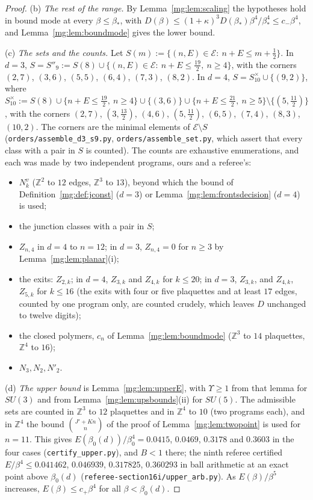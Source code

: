 \documentclass[11pt,a4paper]{article}
\theoremstyle{definition}
\theoremstyle{remark}
\newcommand{\Z}{\mathbb{Z}}
\begin{document}
\begin{proof}
(b) \emph{The rest of the range.} By Lemma~\ref{mg:lem:scaling} the hypotheses hold in bound mode at every $\beta\le\beta_*$, with $D(\beta)\le(1+\kappa)^3D(\beta_*)\beta^4/\beta_*^4\le c_-\beta^4$, and
Lemma~\ref{mg:lem:boundmode} gives the lower bound.

(c) \emph{The sets and the counts.} Let $S(m):=\{(n,E)\in\mathcal E:\ n+E\le m+\frac12\}$. In $d=3$, $S=S''_9:=S(8)\cup\{(n,E)\in\mathcal E:\ n+E\le\frac{19}2,\ n\ge4\}$, with the corners
$(2,7)$, $(3,6)$, $(5,5)$, $(6,4)$, $(7,3)$, $(8,2)$. In $d=4$, $S=S^\times_{10}\cup\{(9,2)\}$, where $S^\times_{10}:=S(8)\cup\{n+E\le\frac{19}2,\ n\ge4\}\cup\{(3,6)\}\cup\{n+E\le\frac{21}2,\ n\ge5\}\setminus\{(5,\frac{11}2)\}$,
with the corners $(2,7)$, $(3,\frac{13}2)$, $(4,6)$, $(5,\frac{11}2)$, $(6,5)$, $(7,4)$, $(8,3)$, $(10,2)$. The corners are the minimal elements of $\mathcal E\setminus S$ (\texttt{orders/assemble\_d3\_s9.py},
\texttt{orders/assemble\_set.py}, which assert that every class with a pair in $S$ is counted). The counts are exhaustive enumerations, and each was made by two independent programs, ours and a referee's:
\begin{itemize}
\item $N^v_k$ ($\Z^2$ to $12$ edges, $\Z^3$ to $13$), beyond which the bound of Definition~\ref{mg:def:jconst} ($d=3$) or Lemma~\ref{mg:lem:frontsdecision} ($d=4$) is used;
\item the junction classes with a pair in $S$;
\item $Z_{n,4}$ in $d=4$ to $n=12$; in $d=3$, $Z_{n,4}=0$ for $n\ge3$ by Lemma~\ref{mg:lem:planar}(i);
\item the exits: $Z_{2,k}$; in $d=4$, $Z_{3,k}$ and $Z_{4,k}$ for $k\le20$; in $d=3$, $Z_{3,k}$, and $Z_{4,k}$, $Z_{5,k}$ for $k\le16$ (the exits with four or five plaquettes and at least $17$ edges,
counted by one program only, are counted crudely, which leaves $D$ unchanged to twelve digits);
\item the closed polymers, $c_n$ of Lemma~\ref{mg:lem:boundmode} ($\Z^3$ to $14$ plaquettes, $\Z^4$ to $16$);
\item $N_3,N_2,N'_2$.
\end{itemize}

(d) \emph{The upper bound} is Lemma~\ref{mg:lem:upperE}, with $\Upsilon\ge1$ from that lemma for $SU(3)$ and from Lemma~\ref{mg:lem:upsbounds}(ii) for $SU(5)$. The admissible sets are counted in $\Z^3$ to
$12$ plaquettes and in $\Z^4$ to $10$ (two programs each), and in $\Z^4$ the bound $\binom{J'+Kn}n$ of the proof of Lemma~\ref{mg:lem:twopoint} is used for $n=11$. This gives
$E(\beta_0(d))/\beta_0^4=0.0415$, $0.0469$, $0.3178$ and $0.3603$ in the four cases (\texttt{certify\_upper.py}), and $B<1$ there; the ninth referee certified
$E/\beta^4\le0.041462$, $0.046939$, $0.317825$, $0.360293$ in ball arithmetic at an exact point above $\beta_0(d)$ (\texttt{referee-section16i/\allowbreak upper\_arb.py}). As $E(\beta)/\beta^5$ increases,
$E(\beta)\le c_+\beta^4$ for all $\beta<\beta_0(d)$.
\end{proof}
\end{document}
